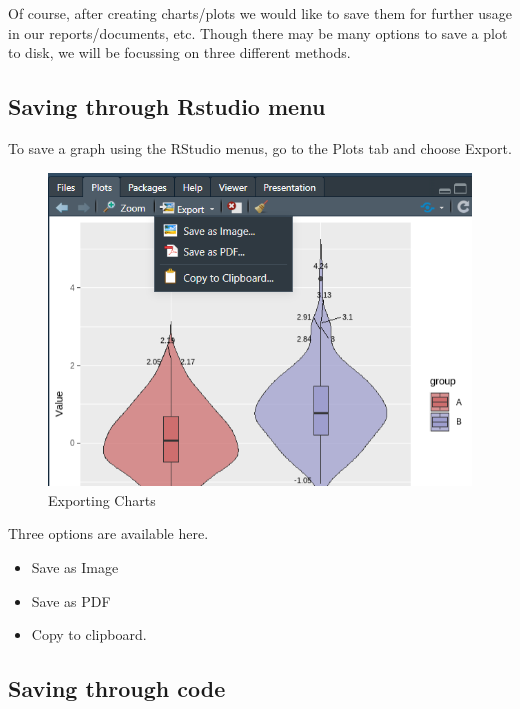 \documentclass[
]{book}
\providecommand{\tightlist}{%
  \setlength{\itemsep}{0pt}\setlength{\parskip}{0pt}}
\begin{document}
Of course, after creating charts/plots we would like to save them for further usage in our reports/documents, etc. Though there may be many options to save a plot to disk, we will be focussing on three different methods.

\hypertarget{saving-through-rstudio-menu}{%
\subsection*{Saving through Rstudio menu}\label{saving-through-rstudio-menu}}

To save a graph using the RStudio menus, go to the Plots tab and choose Export.

\begin{figure}

{\centering \includegraphics[width=0.95\linewidth]{images/export} 

}

\caption{Exporting Charts}\label{fig:export1}
\end{figure}

Three options are available here.

\begin{itemize}
\tightlist
\item
  Save as Image
\item
  Save as PDF
\item
  Copy to clipboard.
\end{itemize}

\hypertarget{saving-through-code}{%
\subsection*{Saving through code}\label{saving-through-code}}
\end{document}
